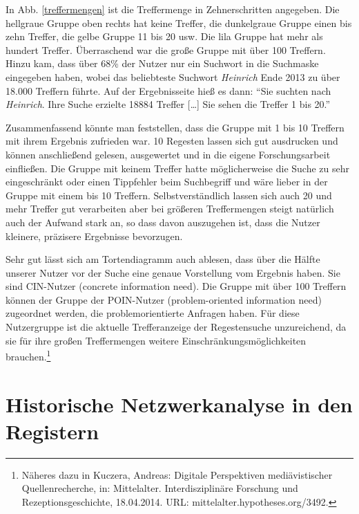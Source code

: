 \documentclass[ngerman,]{scrreprt}
\begin{document}
In Abb. \ref{treffermengen} ist die Treffermenge in Zehnerschritten angegeben. Die hellgraue Gruppe oben rechts hat keine Treffer, die dunkelgraue Gruppe einen bis zehn Treffer, die gelbe Gruppe 11 bis 20 usw. Die lila Gruppe hat mehr als hundert Treffer. Überraschend war die große Gruppe mit über 100 Treffern. Hinzu kam, dass über 68\% der Nutzer nur ein Suchwort in die Suchmaske eingegeben haben, wobei das beliebteste Suchwort \emph{Heinrich} Ende 2013 zu über 18.000 Treffern führte. Auf der Ergebnisseite hieß es dann: ``Sie suchten nach \emph{Heinrich}. Ihre Suche erzielte 18884 Treffer {[}\ldots{}{]} Sie sehen die Treffer 1 bis 20.''

Zusammenfassend könnte man feststellen, dass die Gruppe mit 1 bis 10 Treffern mit ihrem Ergebnis zufrieden war. 10 Regesten lassen sich gut ausdrucken und können anschließend gelesen, ausgewertet und in die eigene Forschungsarbeit einfließen. Die Gruppe mit keinem Treffer hatte möglicherweise die Suche zu sehr eingeschränkt oder einen Tippfehler beim Suchbegriff und wäre lieber in der Gruppe mit einem bis 10 Treffern. Selbstverständlich lassen sich auch 20 und mehr Treffer gut verarbeiten aber bei größeren Treffermengen steigt natürlich auch der Aufwand stark an, so dass davon auszugehen ist, dass die Nutzer kleinere, präzisere Ergebnisse bevorzugen.

Sehr gut lässt sich am Tortendiagramm auch ablesen, dass über die Hälfte unserer Nutzer vor der Suche eine genaue Vorstellung vom Ergebnis haben. Sie sind CIN-Nutzer (concrete information need). Die Gruppe mit über 100 Treffern können der Gruppe der POIN-Nutzer (problem-oriented information need) zugeordnet werden, die problemorientierte Anfragen haben. Für diese Nutzergruppe ist die aktuelle Trefferanzeige der Regestensuche unzureichend, da sie für ihre großen Treffermengen weitere Einschränkungsmöglichkeiten brauchen.\footnote{Näheres dazu in Kuczera, Andreas: Digitale Perspektiven mediävistischer Quellenrecherche, in: Mittelalter. Interdisziplinäre Forschung und Rezeptionsgeschichte, 18.04.2014. URL: mittelalter.hypotheses.org/3492.}

\hypertarget{historische-netzwerkanalyse-in-den-registern}{%
\section{Historische Netzwerkanalyse in den Registern}\label{historische-netzwerkanalyse-in-den-registern}}
\end{document}
